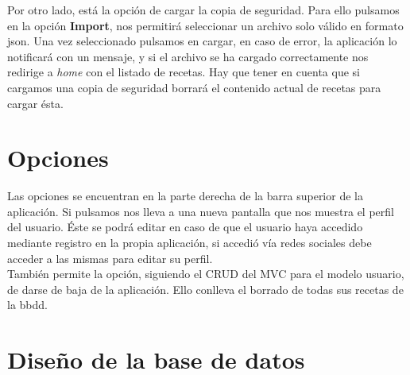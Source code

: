 Por otro lado, está la opción de cargar la copia de seguridad. Para ello pulsamos en la opción \textbf{Import}, nos permitirá seleccionar un archivo solo válido en formato json. Una vez seleccionado pulsamos en cargar, en caso de error, la aplicación lo notificará con un mensaje, y si el archivo se ha cargado correctamente nos redirige a \emph{home} con el listado de recetas. Hay que tener en cuenta que si cargamos una copia de seguridad borrará el contenido actual de recetas para cargar ésta.

\vspace*{0.2in}
\section{Opciones}\label{cap.2.5}

\vspace*{0.1in}
Las opciones se encuentran en la parte derecha de la barra superior de la aplicación. Si pulsamos nos lleva a una nueva pantalla que nos muestra el perfil del usuario. Éste se podrá editar en caso de que el usuario haya accedido mediante registro en la propia aplicación, si accedió vía redes sociales debe acceder a las mismas para editar su perfil. \\

También permite la opción, siguiendo el CRUD del MVC para el modelo usuario, de darse de baja de la aplicación. Ello conlleva el borrado de todas sus recetas de la bbdd.

\vspace*{0.2in}
\section{Diseño de la base de datos}\label{cap.2.6}

\vspace*{0.1in}

%

